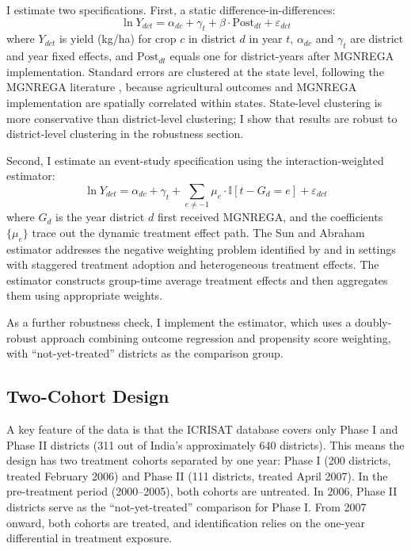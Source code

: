 \documentclass[12pt]{article}
\newcommand{\ind}{\mathbb{I}}
\begin{document}
I estimate two specifications. First, a static difference-in-differences:
\begin{equation}
    \ln Y_{dct} = \alpha_{dc} + \gamma_t + \beta \cdot \text{Post}_{dt} + \varepsilon_{dct}
    \label{eq:static}
\end{equation}
where $Y_{dct}$ is yield (kg/ha) for crop $c$ in district $d$ in year $t$, $\alpha_{dc}$ and $\gamma_t$ are district and year fixed effects, and $\text{Post}_{dt}$ equals one for district-years after MGNREGA implementation. Standard errors are clustered at the state level, following the MGNREGA literature \citep{imbert2015labor, berg2018can}, because agricultural outcomes and MGNREGA implementation are spatially correlated within states. State-level clustering is more conservative than district-level clustering; I show that results are robust to district-level clustering in the robustness section.

Second, I estimate an event-study specification using the \citet{sun2021estimating} interaction-weighted estimator:
\begin{equation}
    \ln Y_{dct} = \alpha_{dc} + \gamma_t + \sum_{e \neq -1} \mu_e \cdot \ind[t - G_d = e] + \varepsilon_{dct}
    \label{eq:eventstudy}
\end{equation}
where $G_d$ is the year district $d$ first received MGNREGA, and the coefficients $\{\mu_e\}$ trace out the dynamic treatment effect path. The Sun and Abraham estimator addresses the negative weighting problem identified by \citet{de2020two} and \citet{goodman2021difference} in settings with staggered treatment adoption and heterogeneous treatment effects. The estimator constructs group-time average treatment effects and then aggregates them using appropriate weights.

As a further robustness check, I implement the \citet{callaway2021difference} estimator, which uses a doubly-robust approach combining outcome regression and propensity score weighting, with ``not-yet-treated'' districts as the comparison group.

\subsection{Two-Cohort Design}

A key feature of the data is that the ICRISAT database covers only Phase I and Phase II districts (311 out of India's approximately 640 districts). This means the design has two treatment cohorts separated by one year: Phase I (200 districts, treated February 2006) and Phase II (111 districts, treated April 2007). In the pre-treatment period (2000--2005), both cohorts are untreated. In 2006, Phase II districts serve as the ``not-yet-treated'' comparison for Phase I. From 2007 onward, both cohorts are treated, and identification relies on the one-year differential in treatment exposure.
\end{document}
